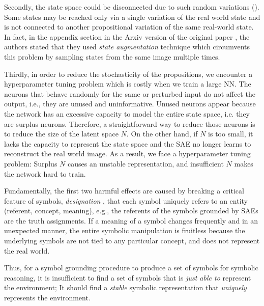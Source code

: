 Secondly, the state space could be disconnected due to such random variations ().
Some states may be reached only via a single variation of the real world state and is not connected to
another propositional variation of the same real-world state.
In fact, in the appendix section in the Arxiv version of the original paper \cite{Asai2018},
the authors stated that they used \emph{state augmentation} technique
which circumvents this problem by sampling states from the same image multiple times.

Thirdly, in order to reduce the stochasticity of the propositions, we encounter a hyperparameter tuning problem
which is costly when we train a large NN.
% 
The neurons that behave randomly for the same or perturbed input do not affect the output,
i.e., they are unused and uninformative.
Unused neurons appear because the network has an excessive capacity to 
model the entire state space, i.e. they are surplus neurons.
Therefore, a straightforward way to reduce those neurons is to reduce the size of the latent space $N$.
On the other hand, if $N$ is too small, it lacks the capacity to represent the state space
and the SAE no longer learns to reconstruct the real world image.
As a result, we face a hyperparameter tuning problem: Surplus $N$ causes an unstable representation,
and insufficient $N$ makes the network hard to train.

Fundamentally,
the first two harmful effects are caused by breaking a critical feature of symbols, \emph{designation} \cite{newell1976computer},
that each symbol uniquely refers to an entity (referent, concept, meaning),
e.g., the referents of the symbols grounded by SAEs are the truth assignments.
If a meaning of a symbol changes frequently and in an unexpected manner, the entire symbolic manipulation is fruitless
because the underlying symbols are not tied to any particular concept, and does not represent the real world.


Thus, for a symbol grounding procedure to produce a set of symbols for symbolic reasoning,
it is insufficient to find a set of symbols that is \emph{just able to} represent the environment;
It should find a \emph{stable} symbolic representation that \emph{uniquely} represents the environment.

